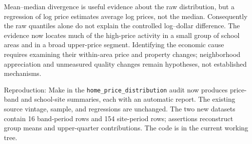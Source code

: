 Mean--median divergence is useful evidence about the raw distribution,
but a regression of log price estimates average log prices, not the median.
Consequently the raw quantiles alone do not explain the controlled log--dollar
difference. The evidence now locates much of the high-price activity in a
small group of school areas and in a broad upper-price segment. Identifying
the economic cause requires examining their within-area price and property
changes; neighborhood appreciation and unmeasured quality changes remain
hypotheses, not established mechanisms.

{\small Reproduction: Make in the \texttt{home\_price\_distribution} audit
now produces price-band and school-site summaries, each with an automatic
report. The existing source vintage, sample, and regressions are unchanged.
The two new datasets contain 16 band-period rows and 154 site-period rows;
assertions reconstruct group means and upper-quarter contributions. The code is in the current working tree.}
